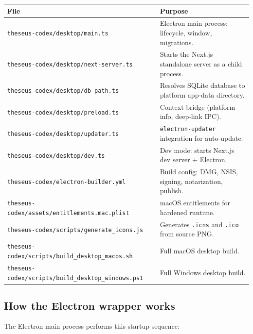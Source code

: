 \documentclass[11pt,letterpaper]{article}
\newcommand{\file}[1]{\texttt{#1}}
\newcommand{\cmd}[1]{\texttt{#1}}
\begin{document}
\begin{table}[h]
\small
\begin{tabular}{p{6cm} p{8.5cm}}
\toprule
\textbf{File} & \textbf{Purpose} \\
\midrule
\file{theseus-codex/desktop/main.ts}          & Electron main process: lifecycle, window, migrations. \\
\file{theseus-codex/desktop/next-server.ts}    & Starts the Next.js standalone server as a child process. \\
\file{theseus-codex/desktop/db-path.ts}        & Resolves SQLite database to platform app-data directory. \\
\file{theseus-codex/desktop/preload.ts}        & Context bridge (platform info, deep-link IPC). \\
\file{theseus-codex/desktop/updater.ts}        & \cmd{electron-updater} integration for auto-update. \\
\file{theseus-codex/desktop/dev.ts}            & Dev mode: starts Next.js dev server + Electron. \\
\file{theseus-codex/electron-builder.yml}      & Build config: DMG, NSIS, signing, notarization, publish. \\
\file{theseus-codex/assets/entitlements.mac.plist} & macOS entitlements for hardened runtime. \\
\file{theseus-codex/scripts/generate\_icons.js}    & Generates \file{.icns} and \file{.ico} from source PNG. \\
\file{theseus-codex/scripts/build\_desktop\_macos.sh} & Full macOS desktop build. \\
\file{theseus-codex/scripts/build\_desktop\_windows.ps1} & Full Windows desktop build. \\
\bottomrule
\end{tabular}
\end{table}

\subsection{How the Electron wrapper works}

The Electron main process performs this startup sequence:
\end{document}
